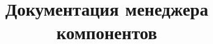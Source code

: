 \documentclass{scndocument}
\begin{document}
\DeactivateBG
\title{\centering
Документация менеджера компонентов}
\author{}
\maketitle

\normalsize

\setcounter{page}{3}

\ActivateBG
\begin{SCn}

\end{SCn}
\end{document}

